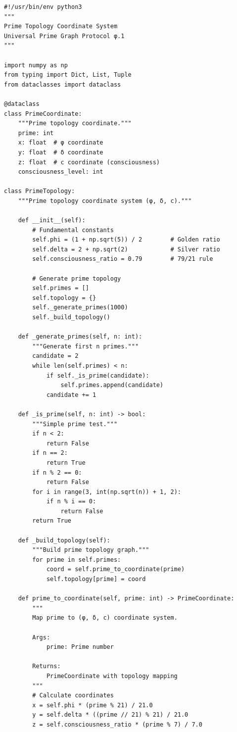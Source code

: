 \begin{lstlisting}[caption={Prime Topology Coordinate System Implementation},label={code:prime_topology}]
#!/usr/bin/env python3
"""
Prime Topology Coordinate System
Universal Prime Graph Protocol φ.1
"""

import numpy as np
from typing import Dict, List, Tuple
from dataclasses import dataclass

@dataclass
class PrimeCoordinate:
    """Prime topology coordinate."""
    prime: int
    x: float  # φ coordinate
    y: float  # δ coordinate
    z: float  # c coordinate (consciousness)
    consciousness_level: int

class PrimeTopology:
    """Prime topology coordinate system (φ, δ, c)."""
    
    def __init__(self):
        # Fundamental constants
        self.phi = (1 + np.sqrt(5)) / 2        # Golden ratio
        self.delta = 2 + np.sqrt(2)            # Silver ratio
        self.consciousness_ratio = 0.79        # 79/21 rule
        
        # Generate prime topology
        self.primes = []
        self.topology = {}
        self._generate_primes(1000)
        self._build_topology()
    
    def _generate_primes(self, n: int):
        """Generate first n primes."""
        candidate = 2
        while len(self.primes) < n:
            if self._is_prime(candidate):
                self.primes.append(candidate)
            candidate += 1
    
    def _is_prime(self, n: int) -> bool:
        """Simple prime test."""
        if n < 2:
            return False
        if n == 2:
            return True
        if n % 2 == 0:
            return False
        for i in range(3, int(np.sqrt(n)) + 1, 2):
            if n % i == 0:
                return False
        return True
    
    def _build_topology(self):
        """Build prime topology graph."""
        for prime in self.primes:
            coord = self.prime_to_coordinate(prime)
            self.topology[prime] = coord
    
    def prime_to_coordinate(self, prime: int) -> PrimeCoordinate:
        """
        Map prime to (φ, δ, c) coordinate system.
        
        Args:
            prime: Prime number
        
        Returns:
            PrimeCoordinate with topology mapping
        """
        # Calculate coordinates
        x = self.phi * (prime % 21) / 21.0
        y = self.delta * ((prime // 21) % 21) / 21.0
        z = self.consciousness_ratio * (prime % 7) / 7.0
        

\end{lstlisting}
